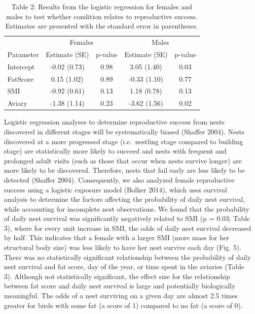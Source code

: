 \documentclass[
]{article}
\begin{document}
\begin{table}

\caption{\label{tab:p2 main results}Table 2: Results from the logistic regression for females and males to test whether condition relates to reproductive success. Estimates are presented with the standard error in parentheses.}
\centering
\begin{tabular}[t]{l|c|c|c|c}
\hline
\multicolumn{1}{c|}{ } & \multicolumn{2}{c|}{Females} & \multicolumn{2}{c}{Males} \\
\cline{2-3} \cline{4-5}
Parameter & Estimate (SE) & p-value & Estimate (SE) & p-value\\
\hline
Intercept & -0.02 (0.73) & 0.98 & 3.05 (1.40) & 0.03\\
\hline
FatScore & 0.15 (1.02) & 0.89 & -0.33 (1.10) & 0.77\\
\hline
SMI & -0.92 (0.61) & 0.13 & 1.18 (0.78) & 0.13\\
\hline
Aviary & -1.38 (1.14) & 0.23 & -3.62 (1.56) & 0.02\\
\hline
\end{tabular}
\end{table}

Logistic regression analyses to determine reproductive success from
nests discovered in different stages will be systematically biased
(Shaffer 2004). Nests discovered at a more progressed stage
(i.e.~nestling stage compared to building stage) are statistically more
likely to succeed and nests with frequent and prolonged adult visits
(such as those that occur when nests survive longer) are more likely to
be discovered. Therefore, nests that fail early are less likely to be
detected (Shaffer 2004). Consequently, we also analyzed female
reproductive success using a logistic exposure model (Bolker 2014),
which uses survival analysis to determine the factors affecting the
probability of daily nest survival, while accounting for incomplete nest
observations. We found that the probability of daily nest survival was
significantly negatively related to SMI (p = 0.03; Table 3), where for
every unit increase in SMI, the odds of daily nest survival decreased by
half. This indicates that a female with a larger SMI (more mass for her
structural body size) was less likely to have her nest survive each day
(Fig. 5). There was no statistically significant relationship between
the probability of daily nest survival and fat score, day of the year,
or time spent in the aviaries (Table 3). Although not statistically
significant, the effect size for the relationship between fat score and
daily nest survival is large and potentially biologically meaningful.
The odds of a nest surviving on a given day are almost 2.5 times greater
for birds with some fat (a score of 1) compared to no fat (a score of
0).
\end{document}
